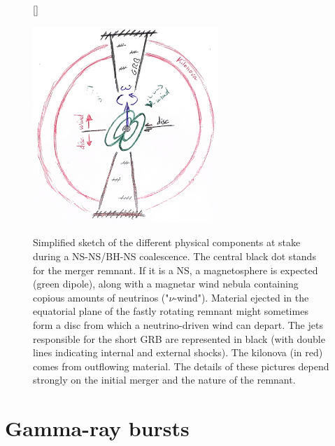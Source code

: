 \documentclass[11pt,onecolumn]{article}
\makeatletter
\newcommand{\grb}{GRB\xspace}
\newcommand*{\ns}{NS\@\xspace}
\newcommand*{\bh}{BH\@\xspace}
\makeatother
\begin{document}
\begin{figure}[!t]
\vspace*{-0.3cm}
[\FBwidth]
{\caption{Simplified sketch of the different physical components at stake during a \ns-\ns/\bh-\ns coalescence. The central black dot stands for the merger remnant. If it is a \ns, a magnetosphere is expected (green dipole), along with a magnetar wind nebula containing copious amounts of neutrinos ("$\nu$-wind"). Material ejected in the equatorial plane of the fastly rotating remnant might sometimes form a disc from which a neutrino-driven wind can depart. The jets responsible for the short \grb are represented in black (with double lines indicating internal and external shocks). The kilonova (in red) comes from outflowing material. The details of these pictures depend strongly on the initial merger and the nature of the remnant.}\label{fig:sketch}}
{\includegraphics[width=7cm]{Figures/sketch_GRB_kilonova.jpg}}
\end{figure}

\section{Gamma-ray bursts}
\end{document}
